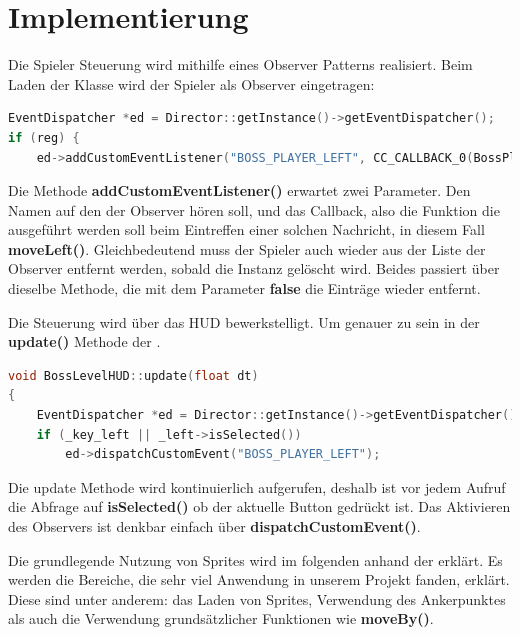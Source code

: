 \chapter{Implementierung}\label{ch:impl}

\label{sec:4_SpielerSteuerung}

Die Spieler Steuerung wird mithilfe eines Observer Patterns realisiert. Beim Laden der  Klasse wird der Spieler als Observer eingetragen:

\begin{lstlisting}[label=lst:player_control_observer,
				   language=C++,
				   firstnumber=103,
				   caption=BossPlayer als Observer eintragen ( BossPlayer.cpp )]
EventDispatcher *ed = Director::getInstance()->getEventDispatcher();
if (reg) {
	ed->addCustomEventListener("BOSS_PLAYER_LEFT", CC_CALLBACK_0(BossPlayer::moveLeft, this));
\end{lstlisting}

Die Methode \textbf{addCustomEventListener()} erwartet zwei Parameter. Den Namen auf den der Observer hören soll, und das Callback, also die Funktion die ausgeführt werden soll beim Eintreffen einer solchen Nachricht, in diesem Fall \textbf{moveLeft()}. 
Gleichbedeutend muss der Spieler auch wieder aus der Liste der Observer entfernt werden, sobald die Instanz gelöscht wird. Beides passiert über dieselbe Methode, die mit dem Parameter \textbf{false} die Einträge wieder entfernt.

Die Steuerung wird über das HUD bewerkstelligt. Um genauer zu sein in der \textbf{update()} Methode der .

\begin{lstlisting}[label=lst:player_control_push_msg,
				   language=C++,
				   firstnumber=181,
				   caption=Drücken des Laufen-Buttons ( BossLevelHUD.cpp )]
void BossLevelHUD::update(float dt)
{
	EventDispatcher *ed = Director::getInstance()->getEventDispatcher();
	if (_key_left || _left->isSelected())
		ed->dispatchCustomEvent("BOSS_PLAYER_LEFT");
\end{lstlisting}

Die update Methode wird kontinuierlich aufgerufen, deshalb ist vor jedem Aufruf die Abfrage auf \textbf{isSelected()} ob der aktuelle Button gedrückt ist. Das Aktivieren des Observers ist denkbar einfach über \textbf{dispatchCustomEvent()}.

Die grundlegende Nutzung von Sprites wird im folgenden anhand der  erklärt. Es werden die Bereiche, die sehr viel Anwendung in unserem Projekt fanden, erklärt. Diese sind unter anderem: das Laden von Sprites, Verwendung des Ankerpunktes als auch die Verwendung grundsätzlicher Funktionen wie \textbf{moveBy()}.

